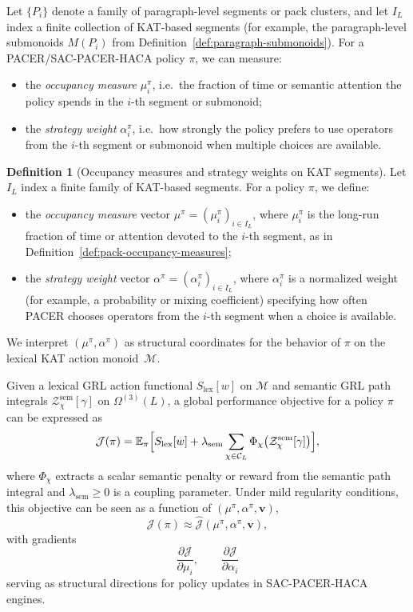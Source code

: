 \documentclass[11pt]{book}
\theoremstyle{plain}
\theoremstyle{definition}
\newtheorem{definition}[theorem]{Definition}
\theoremstyle{remark}
\begin{document}
Let $\{P_i\}$ denote a family of paragraph-level segments or pack
clusters, and let $I_L$ index a finite collection of KAT-based segments
(for example, the paragraph-level submonoids $M(P_i)$ from
Definition~\ref{def:paragraph-submonoids}). For a PACER/SAC-PACER-HACA
policy $\pi$, we can measure:
\begin{itemize}
  \item the \emph{occupancy measure} $\mu_i^\pi$, i.e.\ the fraction
        of time or semantic attention the policy spends in the
        $i$-th segment or submonoid;
  \item the \emph{strategy weight} $\alpha_i^\pi$, i.e.\ how strongly
        the policy prefers to use operators from the $i$-th segment or
        submonoid when multiple choices are available.
\end{itemize}

\begin{definition}[Occupancy measures and strategy weights on KAT segments]
\label{def:mu-alpha-structural-coordinates}
Let $I_L$ index a finite family of KAT-based segments. For a policy
$\pi$, we define:
\begin{itemize}
  \item the \emph{occupancy measure} vector
        $\mu^\pi=(\mu_i^\pi)_{i\in I_L}$, where $\mu_i^\pi$ is the
        long-run fraction of time or attention devoted to the $i$-th
        segment, as in Definition~\ref{def:pack-occupancy-measures};
  \item the \emph{strategy weight} vector
        $\alpha^\pi=(\alpha_i^\pi)_{i\in I_L}$, where $\alpha_i^\pi$
        is a normalized weight (for example, a probability or mixing
        coefficient) specifying how often PACER chooses operators from
        the $i$-th segment when a choice is available.
\end{itemize}
We interpret $(\mu^\pi,\alpha^\pi)$ as structural coordinates for the
behavior of $\pi$ on the lexical KAT action monoid~$\mathcal{M}$.
\end{definition}

Given a lexical GRL action functional $S_{\mathrm{lex}}[w]$ on
$\mathcal{M}$ and semantic GRL path integrals
$\mathcal{Z}^{\mathrm{sem}}_\chi[\gamma]$ on $\Omega^{(3)}(L)$, a
global performance objective for a policy $\pi$ can be expressed as
\[
  \mathcal{J}(\pi)
  =
  \mathbb{E}_\pi
  \Bigl[
    S_{\mathrm{lex}}[w]
    + \lambda_{\mathrm{sem}}
      \sum_{\chi\in\mathcal{C}_L}\Phi_\chi\bigl(\mathcal{Z}^{\mathrm{sem}}_\chi[\gamma]\bigr)
  \Bigr],
\]
where $\Phi_\chi$ extracts a scalar semantic penalty or reward from
the semantic path integral and $\lambda_{\mathrm{sem}}\ge 0$ is a
coupling parameter. Under mild regularity conditions, this objective
can be seen as a function of $(\mu^\pi,\alpha^\pi,\mathbf{v})$,
\[
  \mathcal{J}(\pi)
  \approx
  \widehat{\mathcal{J}}(\mu^\pi,\alpha^\pi,\mathbf{v}),
\]
with gradients
\[
  \frac{\partial\mathcal{J}}{\partial\mu_i},
  \qquad
  \frac{\partial\mathcal{J}}{\partial\alpha_i}
\]
serving as structural directions for policy updates in SAC-PACER-HACA
engines.
\end{document}
